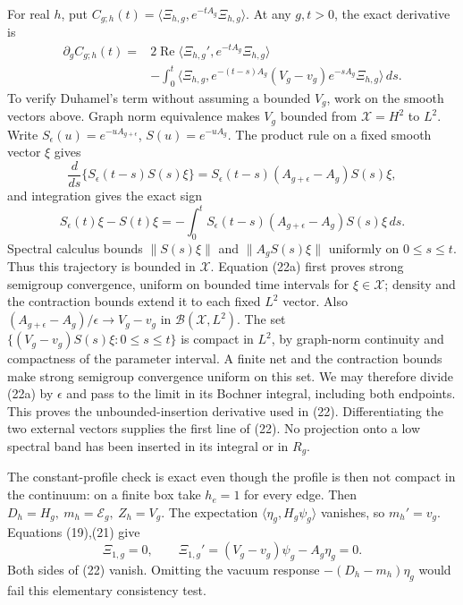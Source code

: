 \documentclass[
  11pt,
]{article}
\begin{document}
For real \(h\), put
\(C_{g;h}(t)=\langle\Xi_{h,g},e^{-tA_g}\Xi_{h,g}\rangle\). At any
\(g,t>0\), the exact derivative is \[
 \boxed{\begin{split}
 \partial_gC_{g;h}(t)
 ={}&2\operatorname{Re}
       \langle\Xi_{h,g}',e^{-tA_g}\Xi_{h,g}\rangle\\
 &-\int_0^t
 \langle\Xi_{h,g},e^{-(t-s)A_g}
                    (V_g-v_g)e^{-sA_g}\Xi_{h,g}\rangle\,ds .
 \end{split}}
 \tag{22}
\] To verify Duhamel's term without assuming a bounded \(V_g\), work on
the smooth vectors above. Graph norm equivalence makes \(V_g\) bounded
from \(\mathscr X=H^2\) to \(L^2\). Write
\(S_\epsilon(u)=e^{-uA_{g+\epsilon}}\), \(S(u)=e^{-uA_g}\). The product
rule on a fixed smooth vector \(\xi\) gives \[
 \frac d{ds}\{S_\epsilon(t-s)S(s)\xi\}
  =S_\epsilon(t-s)(A_{g+\epsilon}-A_g)S(s)\xi,
\] and integration gives the exact sign \[
 S_\epsilon(t)\xi-S(t)\xi
  =-\int_0^tS_\epsilon(t-s)
                (A_{g+\epsilon}-A_g)S(s)\xi\,ds .
 \tag{22a}
\] Spectral calculus bounds \(\|S(s)\xi\|\) and \(\|A_gS(s)\xi\|\)
uniformly on \(0\le s\le t\). Thus this trajectory is bounded in
\(\mathscr X\). Equation (22a) first proves strong semigroup
convergence, uniform on bounded time intervals for \(\xi\in\mathscr X\);
density and the contraction bounds extend it to each fixed \(L^2\)
vector. Also \((A_{g+\epsilon}-A_g)/\epsilon\to V_g-v_g\) in
\(\mathcal B(\mathscr X,L^2)\). The set
\(\{(V_g-v_g)S(s)\xi:0\le s\le t\}\) is compact in \(L^2\), by
graph-norm continuity and compactness of the parameter interval. A
finite net and the contraction bounds make strong semigroup convergence
uniform on this set. We may therefore divide (22a) by \(\epsilon\) and
pass to the limit in its Bochner integral, including both endpoints.
This proves the unbounded-insertion derivative used in (22).
Differentiating the two external vectors supplies the first line of
(22). No projection onto a low spectral band has been inserted in its
integral or in \(R_g\).

The constant-profile check is exact even though the profile is then not
compact in the continuum: on a finite box take \(h_e=1\) for every edge.
Then \(D_h=H_g,\ m_h=\mathcal E_g,\ Z_h=V_g\). The expectation
\(\langle\eta_g,H_g\psi_g\rangle\) vanishes, so \(m_h'=v_g\). Equations
(19),(21) give \[
 \Xi_{1,g}=0,\qquad
 \Xi_{1,g}'=(V_g-v_g)\psi_g-A_g\eta_g=0.
 \tag{23}
\] Both sides of (22) vanish. Omitting the vacuum response
\(-(D_h-m_h)\eta_g\) would fail this elementary consistency test.
\end{document}
